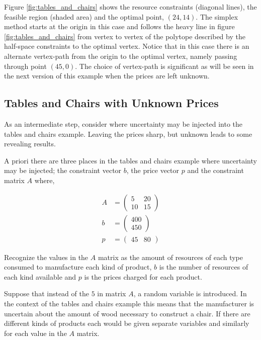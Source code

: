 Figure \ref{fig:tables_and_chairs} shows the resource constraints (diagonal lines), the feasible region (shaded area) and the optimal point, $(24,14)$. The simplex method starts at the origin in this case and follows the heavy line in figure \ref{fig:tables_and_chairs} from vertex to vertex of the polytope described by the half-space constraints to the optimal vertex. Notice that in this case there is an alternate vertex-path from the origin to the optimal vertex, namely passing through point $(45,0)$. The choice of vertex-path is significant as will be seen in the next version of this example when the prices are left unknown.

\subsection{Tables and Chairs with Unknown Prices}

As an intermediate step, consider where uncertainty may be injected into the tables and chairs example. Leaving the prices sharp, but unknown leads to some revealing results.

A priori there are three places in the tables and chairs example where uncertainty may be injected; the constraint vector $b$, the price vector $p$ and the constraint matrix $A$ where,

\begin{align*}
A &= \begin{pmatrix}5&20\\10&15\end{pmatrix}\\
b &= \begin{pmatrix}400\\450\end{pmatrix}\\
p &= \begin{pmatrix}45&80\end{pmatrix}
\end{align*}

Recognize the values in the $A$ matrix as the amount of resources of each type consumed to manufacture each kind of product, $b$ is the number of resources of each kind available and $p$ is the prices charged for each product.

Suppose that instead of the $5$ in matrix $A$, a random variable is introduced. In the context of the tables and chairs example this means that the manufacturer is uncertain about the amount of wood necessary to construct a chair. If there are different kinds of products each would be given separate variables and similarly for each value in the $A$ matrix.

